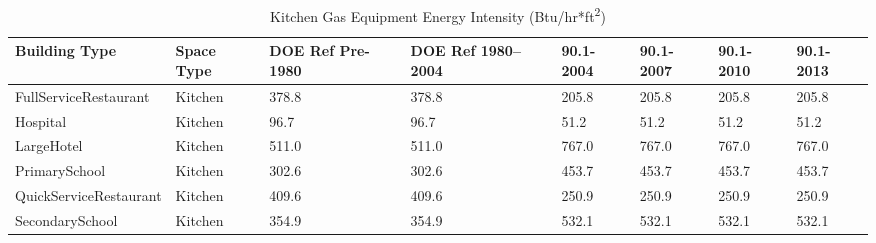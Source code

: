\begin{table}[h]
\small
\centering
\caption[Kitchen Gas Equipment Energy Intensity]{Kitchen Gas Equipment Energy Intensity (Btu/hr*ft\textsuperscript{2})}
\label{tab:kitchen_gas}
\begin{tabular}{|p{1.27in}|p{0.48in}|p{0.5in}|p{0.5in}|p{0.5in}|p{0.5in}|p{0.5in}|p{0.5in}|}
\hline
\textbf{Building Type} & \textbf{Space Type} & \textbf{DOE Ref Pre-1980} & \textbf{DOE Ref 1980--2004} & \textbf{90.1-2004} & \textbf{90.1-2007} & \textbf{90.1-2010} & \textbf{90.1-2013} \\ \hline
{FullServiceRestaurant}  & {Kitchen}    & {378.8}  & {378.8}  & {205.8} & {205.8}   & {205.8} & {205.8} \\ \hline
{Hospital}               & {Kitchen}    & {96.7}   & {96.7}   & {51.2}  & {51.2}    & {51.2}  & {51.2}  \\ \hline
{LargeHotel}             & {Kitchen}    & {511.0}  & {511.0}  & {767.0} & {767.0}   & {767.0} & {767.0} \\ \hline
{PrimarySchool}          & {Kitchen}    & {302.6}  & {302.6}  & {453.7} & {453.7}   & {453.7} & {453.7} \\ \hline
{QuickServiceRestaurant} & {Kitchen}    & {409.6}  & {409.6}  & {250.9} & {250.9}   & {250.9} & {250.9} \\ \hline
{SecondarySchool}        & {Kitchen}    & {354.9}  & {354.9}  & {532.1} & {532.1}   & {532.1} & {532.1} \\ \hline
\end{tabular}
\end{table}